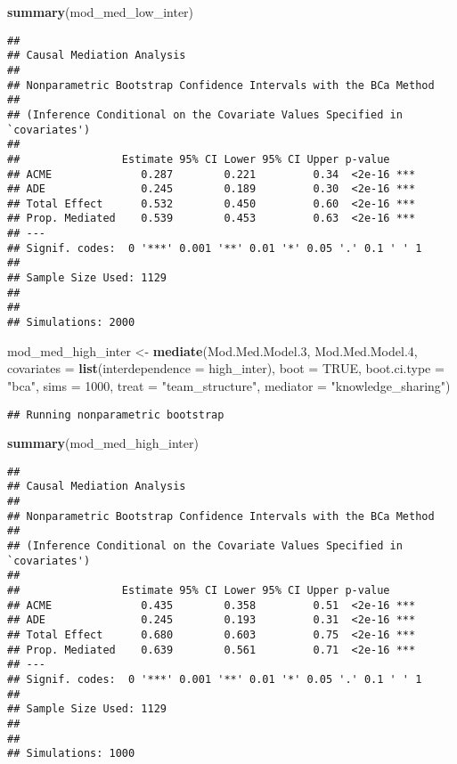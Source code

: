 \documentclass[]{article}
\newenvironment{Shaded}{\begin{snugshade}}{\end{snugshade}}
\newcommand{\DataTypeTok}[1]{\textcolor[rgb]{0.13,0.29,0.53}{#1}}
\newcommand{\DecValTok}[1]{\textcolor[rgb]{0.00,0.00,0.81}{#1}}
\newcommand{\FloatTok}[1]{\textcolor[rgb]{0.00,0.00,0.81}{#1}}
\newcommand{\KeywordTok}[1]{\textcolor[rgb]{0.13,0.29,0.53}{\textbf{#1}}}
\newcommand{\NormalTok}[1]{#1}
\newcommand{\OtherTok}[1]{\textcolor[rgb]{0.56,0.35,0.01}{#1}}
\newcommand{\StringTok}[1]{\textcolor[rgb]{0.31,0.60,0.02}{#1}}
\begin{document}
\begin{Shaded}
\begin{Highlighting}[]
\KeywordTok{summary}\NormalTok{(mod_med_low_inter)}
\end{Highlighting}
\end{Shaded}

\begin{verbatim}
## 
## Causal Mediation Analysis 
## 
## Nonparametric Bootstrap Confidence Intervals with the BCa Method
## 
## (Inference Conditional on the Covariate Values Specified in `covariates')
## 
##                Estimate 95% CI Lower 95% CI Upper p-value    
## ACME              0.287        0.221         0.34  <2e-16 ***
## ADE               0.245        0.189         0.30  <2e-16 ***
## Total Effect      0.532        0.450         0.60  <2e-16 ***
## Prop. Mediated    0.539        0.453         0.63  <2e-16 ***
## ---
## Signif. codes:  0 '***' 0.001 '**' 0.01 '*' 0.05 '.' 0.1 ' ' 1
## 
## Sample Size Used: 1129 
## 
## 
## Simulations: 2000
\end{verbatim}

\begin{Shaded}
\begin{Highlighting}[]
\NormalTok{mod_med_high_inter <-}\StringTok{ }\KeywordTok{mediate}\NormalTok{(Mod.Med.Model}\FloatTok{.3}\NormalTok{, Mod.Med.Model}\FloatTok{.4}\NormalTok{,}
                             \DataTypeTok{covariates =} \KeywordTok{list}\NormalTok{(}\DataTypeTok{interdependence =}\NormalTok{ high_inter), }\DataTypeTok{boot =} \OtherTok{TRUE}\NormalTok{,}
                             \DataTypeTok{boot.ci.type =} \StringTok{"bca"}\NormalTok{,}
                             \DataTypeTok{sims =} \DecValTok{1000}\NormalTok{, }\DataTypeTok{treat =} \StringTok{"team_structure"}\NormalTok{, }
                             \DataTypeTok{mediator =} \StringTok{"knowledge_sharing"}\NormalTok{)}
\end{Highlighting}
\end{Shaded}

\begin{verbatim}
## Running nonparametric bootstrap
\end{verbatim}

\begin{Shaded}
\begin{Highlighting}[]
\KeywordTok{summary}\NormalTok{(mod_med_high_inter)}
\end{Highlighting}
\end{Shaded}

\begin{verbatim}
## 
## Causal Mediation Analysis 
## 
## Nonparametric Bootstrap Confidence Intervals with the BCa Method
## 
## (Inference Conditional on the Covariate Values Specified in `covariates')
## 
##                Estimate 95% CI Lower 95% CI Upper p-value    
## ACME              0.435        0.358         0.51  <2e-16 ***
## ADE               0.245        0.193         0.31  <2e-16 ***
## Total Effect      0.680        0.603         0.75  <2e-16 ***
## Prop. Mediated    0.639        0.561         0.71  <2e-16 ***
## ---
## Signif. codes:  0 '***' 0.001 '**' 0.01 '*' 0.05 '.' 0.1 ' ' 1
## 
## Sample Size Used: 1129 
## 
## 
## Simulations: 1000
\end{verbatim}
\end{document}

